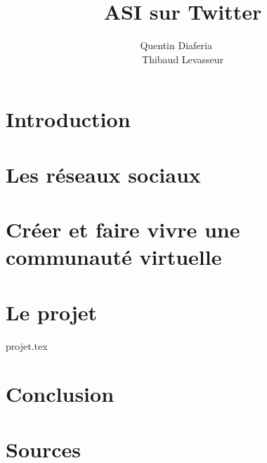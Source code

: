 \documentclass[a4paper,12pt]{article}
\title{ASI sur Twitter}
\author{Quentin Diaferia ~~\\ Thibaud Levasseur}
\begin{document}
\maketitle
\newpage
\tableofcontents
\newpage
\section{Introduction}

\newpage
\section{Les réseaux sociaux}

\newpage
\section{Créer et faire vivre une communauté virtuelle}

\newpage
\section{Le projet}
 {projet.tex}
\newpage
\section{Conclusion}
\newpage
\section{Sources}

\end{document}
